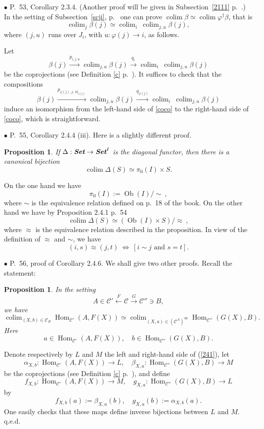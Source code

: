 \documentclass[12pt]{article}
\newtheorem{prop}[thm]{Proposition}
\theoremstyle{remark}%
\newcommand{\bu}{\bullet}
\newcommand{\n}{\noindent}
\newcommand{\C}{\mathcal C}
\newcommand{\p}{\varphi}
\newcommand{\pf}{\n{\em Proof. }}
\newcommand{\be}{\begin{equation}}
\newcommand{\ee}{\end{equation}}
\newcommand{\bp}{\begin{prop}}
\newcommand{\ep}{\end{prop}}
\DeclareMathOperator*{\coli}{colim}
\DeclareMathOperator*{\co}{colim}
\DeclareMathOperator{\id}{id}
\DeclareMathOperator{\Hom}{Hom}
\DeclareMathOperator{\Ob}{Ob}
\DeclareMathOperator{\op}{op}
\begin{document}

\n$\bu$ P.~53, Corollary 2.3.4. (Another proof will be given in Subsection~\ref{2111} p.~\pageref{2111}.) In the setting of Subsection~\ref{scji}, p.~\pageref{scji} one can prove $\co\beta\simeq\co\p^\dagger\beta$, that is 
%
\be\label{coco} 
\co_j\beta(j)\simeq\co_i\ \co_{j,u}\beta(j),  
\ee 
% 
where $(j,u)$ runs over $J_i$, with $u:\p(j)\to i$, as follows. 

Let 
$$ 
\beta(j)\xrightarrow{p_{i,j,u}}\co_{j,u}\beta(j)\xrightarrow{q_i}\co_i\ \co_{j,u}\beta(j)
$$ 
be the coprojections (see Definition \ref{c} p.~\pageref{c}). It suffices to check that the compositions 
$$
\beta(j)\xrightarrow{p_{\p(j),j,\id_{\p(j)}}}\co_{j,u}\beta(j)\xrightarrow{q_{\p(j)}}\co_i\ \co_{j,u}\beta(j)
$$ 
induce an isomorphism from the left-hand side of \eqref{coco} to the right-hand side of \eqref{coco}, which is straightforward. 


\n$\bu$ P.~55, Corollary 2.4.4 (iii). Here is a slightly different proof. 
%
\bp\label{244}
If $\Delta:\textbf{\em Set}\to\textbf{\em Set}^I$ is the diagonal functor, then there is a canonical bijection
$$
\coli\Delta(S)\simeq\pi_0(I)\times S.
$$
\ep 
%
\pf On the one hand we have 
$$
\pi_0(I):=\Ob(I)/\!\!\sim\ , 
$$
where $\sim$ is the equivalence relation defined on p.~18 of the book. On the other hand  we have by Proposition 2.4.1 p.~54
$$
\coli\Delta(S)\simeq(\Ob(I)\times S)/\!\!\approx\ ,
$$
where $\approx$ is the equivalence relation described in the proposition. In view of the definition of $\approx$ and $\sim$, we have 
$$
(i,s)\approx(j,t)\ \iff\ [i\sim j\text{ and }s=t].
$$  


\n$\bu$ P.~56, proof of Corollary 2.4.6. We shall give two other proofs. Recall the statement: 
%
\bp 
In the setting 
% 
\begin{equation}\label{241s}
A\in\C'\xleftarrow{F}\C\xrightarrow{G}\C''\ni B, 
\end{equation} 
% 
we have 
% 
\begin{equation}\label{241} 
\coli_{(X,b)\in\C_B}\Hom_{\C'}(A,F(X))\simeq 
\coli_{(X,a)\in(\C^A)^{\op}}\Hom_{\C''}(G(X),B). 
\end{equation} 
% 
Here  
$$
a\in\Hom_{\C'}(A,F(X)),\quad b\in\Hom_{\C''}(G(X),B). 
$$ 
\ep
% 
\n{\em First proof.} Denote respectively by $L$ and $M$ the left and right-hand side of (\ref{241}), let 
$$
\alpha_{X,b}:\Hom_{\C'}(A,F(X))\to L,\quad\beta_{X,a}:\Hom_{\C''}(G(X),B)\to M
$$
be the coprojections (see Definition \ref{c} p.~\pageref{c}), and define 
$$
f_{X,b}:\Hom_{\C'}(A,F(X))\to M,\quad g_{X,a}:\Hom_{\C''}(G(X),B)\to L
$$
by
$$
f_{X,b}(a):=\beta_{X,a}(b),\quad g_{X,a}(b):=\alpha_{X,b}(a).
$$
One easily checks that these maps define inverse bijections between $L$ and $M$. q.e.d. 
\end{document}

